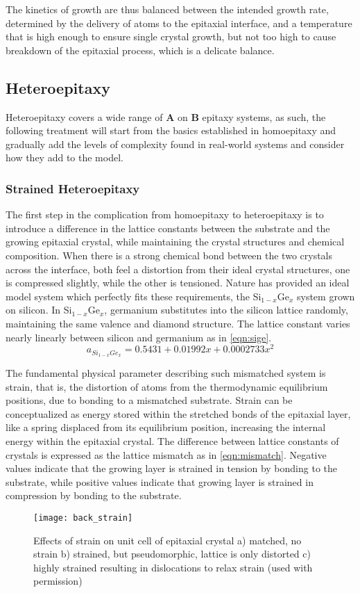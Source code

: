 The kinetics of growth are thus balanced between the intended growth rate, determined by the delivery of atoms to the epitaxial interface, and a temperature that is high enough to ensure single crystal growth, but not too high to cause breakdown of the epitaxial process, which is a delicate balance.

\subsection{Heteroepitaxy} Heteroepitaxy covers a wide range of \textbf{A} on \textbf{B} epitaxy systems, as such, the following treatment will start from the basics established in homoepitaxy and gradually add the levels of complexity found in real-world systems and consider how they add to the model.

\subsubsection{Strained Heteroepitaxy} The first step in the complication from homoepitaxy to heteroepitaxy is to introduce a difference in the lattice constants between the substrate and the growing epitaxial crystal, while maintaining the crystal structures and chemical composition.
When there is a strong chemical bond between the two crystals across the interface, both feel a distortion from their ideal crystal structures, one is compressed slightly, while the other is tensioned\cite{Dunstan1997}.
Nature has provided an ideal model system which perfectly fits these requirements, the Si\(_{1-x}\)Ge\(_x\) system grown on silicon\cite{Paul2004}.
In Si\(_{1-x}\)Ge\(_x\), germanium substitutes into the silicon lattice randomly, maintaining the same valence and diamond structure.
The lattice constant varies nearly linearly between silicon and germanium as in \cref{eqn:sige}.
\begin{equation}
 a_{Si_{1-x}Ge_x} = 0.5431 + 0.01992x + 0.0002733x^2 \label{eqn:sige}
\end{equation}

The fundamental physical parameter describing such mismatched system is strain, that is, the distortion of atoms from the thermodynamic equilibrium positions, due to bonding to a mismatched substrate.
Strain can be conceptualized as energy stored within the stretched bonds of the epitaxial layer, like a spring displaced from its equilibrium position, increasing the internal energy within the epitaxial crystal. The difference between lattice constants of crystals is expressed as the lattice mismatch as in \cref{eqn:mismatch}.
Negative values indicate that the growing layer is strained in tension by bonding to the substrate, while positive values indicate that growing layer is strained in compression by bonding to the substrate.
\begin{figure}
 \centering \texttt{[image: back\_strain]}
 \caption[Unit cell strain visualization]{\label{fig:back_strain}Effects of strain on unit cell of epitaxial crystal a) matched, no strain b) strained, but pseudomorphic, lattice is only distorted c) highly strained resulting in dislocations to relax strain\cite{ohring2001materials} (used with permission)}
\end{figure}

